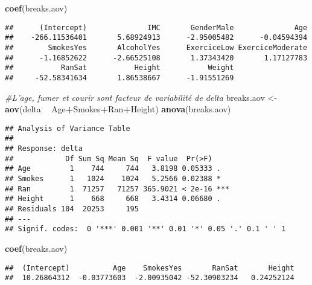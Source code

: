 \documentclass[]{article}
\newenvironment{Shaded}{\begin{snugshade}}{\end{snugshade}}
\newcommand{\KeywordTok}[1]{\textcolor[rgb]{0.13,0.29,0.53}{\textbf{#1}}}
\newcommand{\StringTok}[1]{\textcolor[rgb]{0.31,0.60,0.02}{#1}}
\newcommand{\CommentTok}[1]{\textcolor[rgb]{0.56,0.35,0.01}{\textit{#1}}}
\newcommand{\OperatorTok}[1]{\textcolor[rgb]{0.81,0.36,0.00}{\textbf{#1}}}
\newcommand{\NormalTok}[1]{#1}
\begin{document}
\begin{Shaded}
\begin{Highlighting}[]
\KeywordTok{coef}\NormalTok{(breaks.aov)}
\end{Highlighting}
\end{Shaded}

\begin{verbatim}
##      (Intercept)              IMC       GenderMale              Age 
##    -266.11536401       5.68924913      -2.95005482      -0.04594394 
##        SmokesYes       AlcoholYes      ExerciceLow ExerciceModerate 
##      -1.16852622      -2.66525108       1.37343420       1.17127783 
##           RanSat           Height           Weight 
##     -52.58341634       1.86538667      -1.91551269
\end{verbatim}

\begin{Shaded}
\begin{Highlighting}[]
\CommentTok{#L'age, fumer et courir sont facteur de variabilité de delta}
\NormalTok{breaks.aov <-}\StringTok{ }\KeywordTok{aov}\NormalTok{(delta }\OperatorTok{~}\StringTok{ }\NormalTok{Age}\OperatorTok{+}\NormalTok{Smokes}\OperatorTok{+}\NormalTok{Ran}\OperatorTok{+}\NormalTok{Height)}
\KeywordTok{anova}\NormalTok{(breaks.aov)  }
\end{Highlighting}
\end{Shaded}

\begin{verbatim}
## Analysis of Variance Table
## 
## Response: delta
##            Df Sum Sq Mean Sq  F value  Pr(>F)    
## Age         1    744     744   3.8198 0.05333 .  
## Smokes      1   1024    1024   5.2566 0.02388 *  
## Ran         1  71257   71257 365.9021 < 2e-16 ***
## Height      1    668     668   3.4314 0.06680 .  
## Residuals 104  20253     195                     
## ---
## Signif. codes:  0 '***' 0.001 '**' 0.01 '*' 0.05 '.' 0.1 ' ' 1
\end{verbatim}

\begin{Shaded}
\begin{Highlighting}[]
\KeywordTok{coef}\NormalTok{(breaks.aov)}
\end{Highlighting}
\end{Shaded}

\begin{verbatim}
##  (Intercept)          Age    SmokesYes       RanSat       Height 
##  10.26864312  -0.03773603  -2.00935042 -52.30903234   0.24252124
\end{verbatim}
\end{document}
